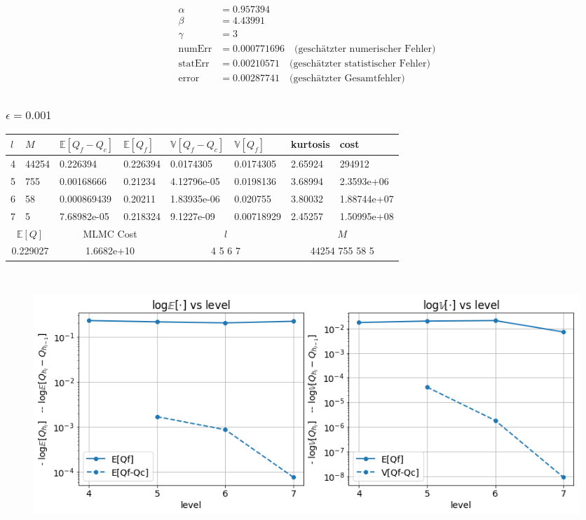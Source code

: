 \begin{align*}
\alpha  &=    0.957394   \\
\beta   &=    4.43991   \\
\gamma  &=    3   \\
\text{numErr}  &= 0.000771696   \quad \text{(geschätzter numerischer Fehler)}\\
\text{statErr} &= 0.00210571  \quad  \text{(geschätzter statistischer Fehler)}\\
\text{error}   &= 0.00287741  \quad  \text{(geschätzter Gesamtfehler)}\\
\end{align*}


\subsubsection{$ \epsilon=0.001 $}

\noindent\begin{tabular}{|p{0.15\q}|p{0.54\q}|p{1.4\q}|p{1.05\q}|p{1.35\q}|p{1.25\q}|p{0.9\q}|p{1.35\q}|}
\hline
$ l $   &  $ M $  &  $ \mathbb{E}[Q_f-Q_c] $  &   $ \mathbb{E}[Q_f] $ &  $ \mathbb{V}[Q_f-Q_c] $   &   $ \mathbb{V}[Q_f] $ &  kurtosis    &    cost\\
\hline
4 & 44254  & 0.226394   &  0.226394 &  0.0174305   &  0.0174305  &   2.65924   &   294912    \\
5 &  755   & 0.00168666 &  0.21234  &  4.12796e-05 &  0.0198136  &   3.68994   &   2.3593e+06\\
6 &   58   & 0.000869439&  0.20211  &  1.83935e-06 &   0.020755  &   3.80032   &   1.88744e+07 \\
7 &    5   & 7.68982e-05&    0.218324&  9.1227e-09&  0.00718929   &  2.45257 &1.50995e+08 \\
\hline 
 \multicolumn{2}{|c|}{$ \mathbb{E}[Q] $ }  &  \multicolumn{2}{c|}{MLMC Cost}   & \multicolumn{2}{c|}{$ l $}  &    \multicolumn{2}{c|}{$ M$} \\
\hline
 \multicolumn{2}{|c|}{0.229027} & \multicolumn{2}{c|}{1.6682e+10  } &  \multicolumn{2}{c|}{  4 5 6 7 }     & \multicolumn{2}{c|}{44254 755 58 5}    \\
\hline 
\end{tabular}\\

\begin{figure}[H]
	\centering
	\includegraphics[width=\textwidth]{plots/eps0001.png} 
\end{figure}

